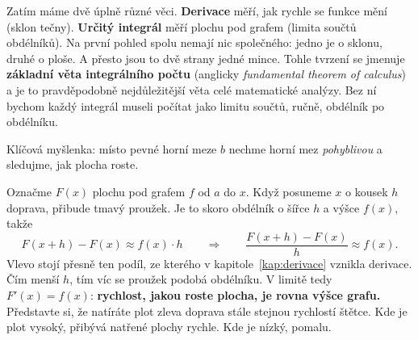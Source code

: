 Zatím máme dvě úplně různé věci. \textbf{Derivace} měří, jak rychle se funkce mění (sklon tečny). \textbf{Určitý integrál} měří plochu pod grafem (limita součtů obdélníků). Na první pohled spolu nemají nic společného: jedno je o sklonu, druhé o ploše. A přesto jsou to dvě strany jedné mince. Tohle tvrzení se jmenuje \textbf{základní věta integrálního počtu} (anglicky \textit{fundamental theorem of calculus}) a je to pravděpodobně nejdůležitější věta celé matematické analýzy. Bez ní bychom každý integrál museli počítat jako limitu součtů, ručně, obdélník po obdélníku.

Klíčová myšlenka: místo pevné horní meze $b$ nechme horní mez \textit{pohyblivou} a sledujme, jak plocha roste.

\begin{center}
\end{center}

Označme $F(x)$ plochu pod grafem $f$ od $a$ do $x$. Když posuneme $x$ o kousek $h$ doprava, přibude tmavý proužek. Je to skoro obdélník o šířce $h$ a výšce $f(x)$, takže
\begin{equation*}
  F(x + h) - F(x)\approx f(x)\cdot h\qquad\Longrightarrow\qquad\frac{F(x + h) - F(x)}{h}\approx f(x).
\end{equation*}
Vlevo stojí přesně ten podíl, ze kterého v kapitole~\ref{kap:derivace} vznikla derivace. Čím menší $h$, tím víc se proužek podobá obdélníku. V limitě tedy $F'(x) = f(x)$: \textbf{rychlost, jakou roste plocha, je rovna výšce grafu.} Představte si, že natíráte plot zleva doprava stále stejnou rychlostí štětce. Kde je plot vysoký, přibývá natřené plochy rychle. Kde je nízký, pomalu.

